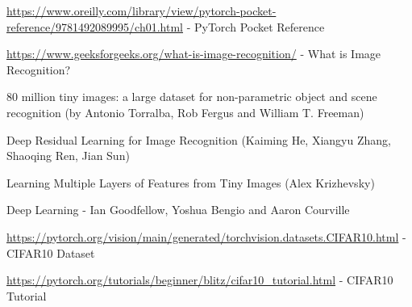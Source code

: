 \documentclass[../main.tex]{subfiles}
\begin{document}
\url{https://www.oreilly.com/library/view/pytorch-pocket-reference/9781492089995/ch01.html} - PyTorch Pocket Reference

\url{https://www.geeksforgeeks.org/what-is-image-recognition/} - What is Image Recognition?

80 million tiny images: a large dataset for non-parametric object and scene recognition (by Antonio Torralba, Rob Fergus and William T. Freeman)

Deep Residual Learning for Image Recognition (Kaiming He, Xiangyu Zhang, Shaoqing Ren, Jian Sun)

Learning Multiple Layers of Features from Tiny Images (Alex Krizhevsky)

Deep Learning - Ian Goodfellow, Yoshua Bengio and Aaron Courville

\url{https://pytorch.org/vision/main/generated/torchvision.datasets.CIFAR10.html} - CIFAR10 Dataset

\url{https://pytorch.org/tutorials/beginner/blitz/cifar10_tutorial.html} - CIFAR10 Tutorial
\end{document}
